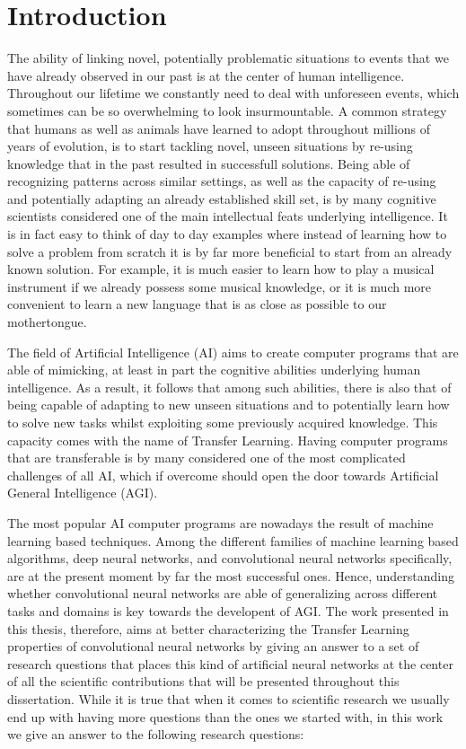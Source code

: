 \chapter*{Introduction}
\label{ch:introduction}

The ability of linking novel, potentially problematic situations to events that we have already observed in our past is at the center of human intelligence. Throughout our lifetime we constantly need to deal with unforeseen events, which sometimes can be so overwhelming to look insurmountable. A common strategy that humans as well as animals have learned to adopt throughout millions of years of evolution, is to start tackling novel, unseen situations by re-using knowledge that in the past resulted in successfull solutions. Being able of recognizing patterns across similar settings, as well as the capacity of re-using and potentially adapting an already established skill set, is by many cognitive scientists considered one of the main intellectual feats underlying intelligence. It is in fact easy to think of day to day examples where instead of learning how to solve a problem from scratch it is by far more beneficial to start from an already known solution. For example, it is much easier to learn how to play a musical instrument if we already possess some musical knowledge, or it is much more convenient to learn a new language that is as close as possible to our mothertongue.

The field of Artificial Intelligence (AI) aims to create computer programs that are able of mimicking, at least in part the cognitive abilities underlying human intelligence. As a result, it follows that among such abilities, there is also that of being capable of adapting to new unseen situations and to potentially learn how to solve new tasks whilst exploiting some previously acquired knowledge. This capacity comes with the name of Transfer Learning. Having computer programs that are transferable is by many considered one of the most complicated challenges of all AI, which if overcome should open the door towards Artificial General Intelligence (AGI). 

The most popular AI computer programs are nowadays the result of machine learning based techniques. Among the different families of machine learning based algorithms, deep neural networks, and convolutional neural networks specifically, are at the present moment by far the most successful ones. Hence, understanding whether convolutional neural networks are able of generalizing across different tasks and domains is key towards the developent of AGI. The work presented in this thesis, therefore, aims at better characterizing the Transfer Learning properties of convolutional neural networks by giving an answer to a set of research questions that places this kind of artificial neural networks at the center of all the scientific contributions that will be presented throughout this dissertation. While it is true that when it comes to scientific research we usually end up with having more questions than the ones we started with, in this work we give an answer to the following research questions:


